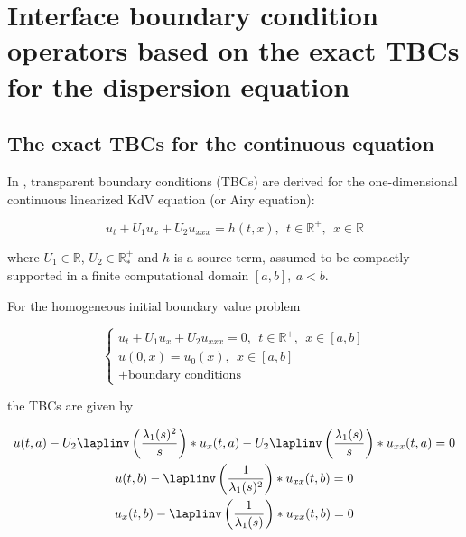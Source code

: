 \section{Interface boundary condition operators based on the exact TBCs for the dispersion equation}
\label{sec:TBC}

\subsection{The exact TBCs for the continuous equation}

\indent In \cite{besse2015}, transparent boundary conditions (TBCs) are derived for the one-dimensional continuous linearized KdV equation (or Airy equation):

\begin{equation}
 	\label{eq:LKdV}
 	u_t + U_1u_x + U_2u_{xxx} = h(t,x), \ \ t \in \mathbb{R}^+, \ \ x \in \mathbb{R}
\end{equation}

\noindent where $U_1 \in \mathbb{R}$, $U_2 \in \mathbb{R}^+_*$ and $h$ is a source term, assumed to be compactly supported in a finite computational domain $[a,b], \ a < b$.

\indent For the homogeneous initial boundary value problem 

\begin{equation*}
\begin{cases}
	u_t + U_1u_x + U_2u_{xxx} = 0, \ \ t \in \mathbb{R}^+, \ \ x \in [a,b] \\
	u(0,x) = u_0(x), \ \ x \in [a,b] \\
	+ \text{boundary conditions} \nonumber
\end{cases}
\end{equation*}

\noindent the TBCs are given by \cite[equations (2.17) -(2.18)]{besse2015}

\begin{equation}
\label{eq:continuousTBC}
\begin{gathered}
        u(t,a) - U_2 \laplinv \left( \frac{\lambda_1(s)^2}{s} \right) * u_x(t,a) - U_2 \laplinv \left( \frac{\lambda_1(s)}{s} \right) * u_{xx}(t,a) = 0 \\ 
        u(t,b) - \laplinv \left( \frac{1}{\lambda_1(s)^2} \right) * u_{xx}(t,b) = 0 \\
        u_x(t,b) - \laplinv \left( \frac{1}{\lambda_1(s)} \right) * u_{xx}(t,b) = 0 
\end{gathered}
\end{equation}

